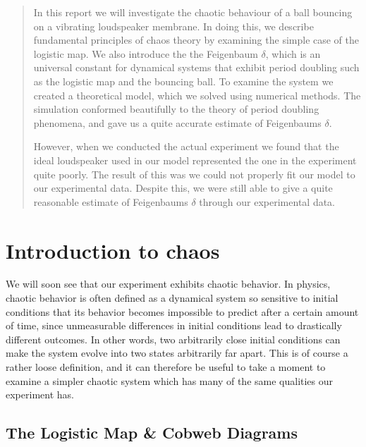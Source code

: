\documentclass[12pt,oneside,a4paper]{article}
\numberwithin{equation}{section}
\begin{document}
{{{{\begin{abstract}
\end{abstract}

\begin{abstract}
\setlength{\parindent}{0cm}
\setlength{\parskip}{0.3cm}
\noindent In this report we will investigate the chaotic behaviour of a ball bouncing on a vibrating loudspeaker membrane. In doing this, we describe fundamental principles of chaos theory by examining the simple case of the logistic map. We also introduce the the Feigenbaum $\delta$, which is an universal constant for dynamical systems that exhibit period doubling such as the logistic map and the bouncing ball. To examine the system we created a theoretical model, which we solved using numerical methods. The simulation conformed beautifully to the theory of period doubling phenomena, and gave us a quite accurate estimate of Feigenbaums $\delta$.

However, when we conducted the actual experiment we found that the ideal loudspeaker used in our model represented the one in the experiment quite poorly. The result of this was we could not properly fit our model to our experimental data. Despite this, we were still able to give a quite reasonable estimate of Feigenbaums $\delta$ through our experimental data.
\end{abstract}

\newpage

\tableofcontents


\newpage
{}
\section{Introduction to chaos}
\label{chaos}
We will soon see that our experiment exhibits chaotic behavior. In physics, 
chaotic behavior is often defined as a dynamical system so sensitive to 
initial conditions that its behavior becomes impossible to predict after a 
certain amount of time, since unmeasurable differences in initial conditions 
lead to drastically different outcomes. In other words, two arbitrarily close 
initial conditions can make the system evolve into two states arbitrarily far 
apart. This is of course a rather loose definition, and it can therefore be 
useful to take a moment to examine a simpler chaotic system which has many of 
the same qualities our experiment has.

\subsection{The Logistic Map \& Cobweb Diagrams}

}}}}
\end{document}
